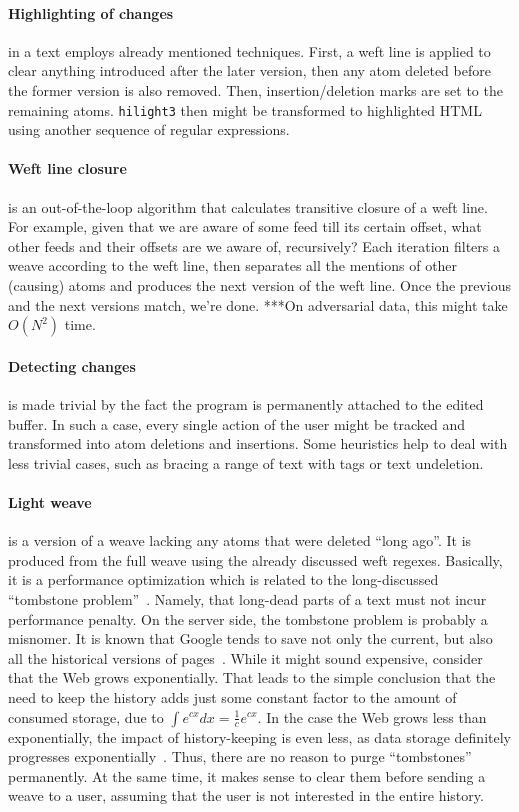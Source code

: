 \documentclass{acm_proc_article-sp}
\begin{document}
\paragraph{Highlighting of changes} in a text employs already mentioned techniques. First, a weft line is applied to clear anything introduced after the later version, then any atom deleted before the former version is also removed. Then, insertion/deletion marks are set to the remaining atoms. {\tt hilight3} then might be transformed to highlighted HTML using another sequence of regular expressions.

\paragraph{Weft line closure} is an out-of-the-loop algorithm that calculates transitive closure of a weft line. For example, given that we are aware of some feed till its certain offset, what other feeds and their offsets are we aware of, recursively? Each iteration filters a weave according to the weft line, then separates all the mentions of other (causing) atoms and produces the next version of the weft line. Once the previous and the next versions match, we're done. ***On adversarial data, this might take $O(N^{2})$ time.

\paragraph{Detecting changes} is made trivial by the fact the program is permanently attached to the edited buffer. In such a case, every single action of the user might be tracked and transformed into atom deletions and insertions. Some heuristics help to deal with less trivial cases, such as bracing a range of text with tags or text undeletion.

\paragraph{Light weave} is a version of a weave lacking any atoms that were deleted ``long ago''. It is produced from the full weave using the already discussed weft regexes. Basically, it is a performance optimization which is related to the long-discussed ``tombstone problem''~\cite{ot}. Namely, that long-dead parts of a text must not incur performance penalty. On the server side, the tombstone problem is probably a misnomer. It is known that Google tends to save not only the current, but also all the historical versions of pages~\cite{google-history}. While it might sound expensive, consider that the Web grows exponentially. That leads to the simple conclusion that the need to keep the history adds just some constant factor to the amount of consumed storage, due to $\int e^{cx}dx = \frac{1}{c} e^{cx}$. In the case the Web grows less than exponentially, the impact of history-keeping is even less, as data storage definitely progresses exponentially~\cite{hdd}. Thus, there are no reason to purge ``tombstones'' permanently. At the same time, it makes sense to clear them before sending a weave to a user, assuming that the user is not interested in the entire history.
\end{document}
